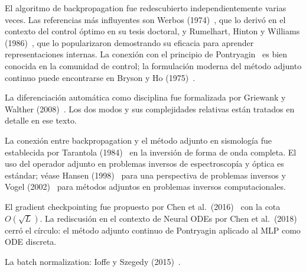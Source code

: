 \begin{notasbib}
El algoritmo de backpropagation fue redescubierto independientemente varias
veces. Las referencias más influyentes son Werbos
(1974)~\cite{werbos1974beyond}, que lo derivó en el contexto del control
óptimo en su tesis doctoral, y Rumelhart, Hinton y Williams
(1986)~\cite{rumelhart1986learning}, que lo popularizaron demostrando su
eficacia para aprender representaciones internas. La conexión con el
principio de Pontryagin~\cite{pontryagin1962mathematical} es bien conocida
en la comunidad de control; la formulación moderna del método adjunto
continuo puede encontrarse en Bryson y Ho
(1975)~\cite{bryson1975applied}.

La diferenciación automática como disciplina fue formalizada por Griewank
y Walther (2008)~\cite{griewank2008evaluating}. Los dos modos y sus
complejidades relativas están tratados en detalle en ese texto.

La conexión entre backpropagation y el método adjunto en sismología fue
establecida por Tarantola (1984)~\cite{tarantola1984inversion} en la
inversión de forma de onda completa. El uso del operador adjunto en
problemas inversos de espectroscopía y óptica es estándar; véase
Hansen (1998)~\cite{hansen1998rank} para una perspectiva de problemas
inversos y Vogel (2002)~\cite{vogel2002computational} para métodos
adjuntos en problemas inversos computacionales.

El gradient checkpointing fue propuesto por Chen et al.\
(2016)~\cite{chen2016training} con la cota $O(\sqrt{L})$. La rediscusión
en el contexto de Neural ODEs por Chen et al.\
(2018)~\cite{chen2018neural} cerró el círculo: el método adjunto continuo
de Pontryagin aplicado al MLP como ODE discreta.

La batch normalization: Ioffe y Szegedy
(2015)~\cite{ioffe2015batch}.
\end{notasbib}


